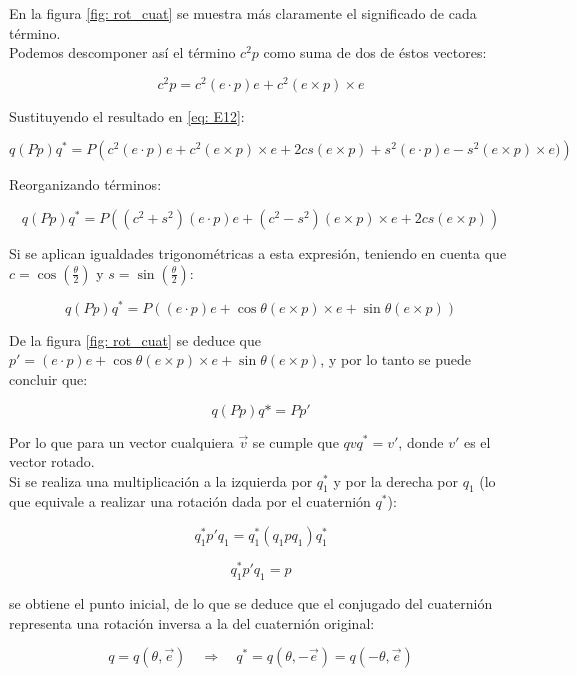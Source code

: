 \documentclass[10pt, a4paper]{report}
\begin{document}
En la figura \ref{fig: rot_cuat} se muestra más claramente el significado de cada término.\\

Podemos descomponer así el término $c^2p$ como suma de dos de éstos vectores:

$$ c^2p = c^2(e \cdot p)e + c^2(e \times p) \times e $$

Sustituyendo el resultado en \eqref{eq: E12}:

$$ q(Pp)q^* = P\left(c^2(e \cdot p)e + c^2(e \times p) \times e + 2cs(e \times p) + s^2(e \cdot p)e - s^2(e \times p) \times e)\right) $$

Reorganizando términos:

$$ q(Pp)q^* = P\left((c^2 + s^2)(e \cdot p)e + (c^2 - s^2)(e \times p) \times e + 2cs(e \times p)\right) $$

Si se aplican igualdades trigonométricas a esta expresión, teniendo en cuenta que $c = \cos\left(\frac{\theta}{2}\right)$ y $s = \sin\left(\frac{\theta}{2}\right)$:

$$ q(Pp)q^* = P\left((e \cdot p)e + \cos\theta(e \times p) \times e + \sin\theta(e \times p)\right) $$

De la figura \ref{fig: rot_cuat} se deduce que $ p' = (e \cdot p)e + \cos\theta(e \times p) \times e + \sin\theta(e \times p)$, y por lo tanto se puede concluir que:

$$ q(Pp)q* = Pp' $$

Por lo que para un vector cualquiera $\vec{v}$ se cumple que $qvq^* = v'$, donde $v'$ es el vector rotado. \\

Si se realiza una multiplicación a la izquierda por $q_1^*$ y por la derecha por $q_1$ (lo que equivale a realizar una rotación dada por el cuaternión $q^*$):

\begin{equation}
q_1^*p'q_1 = q_1^*(q_1pq_1)q_1^*
\end{equation}

\begin{equation}
q_1^*p'q_1 = p
\end{equation}

se obtiene el punto inicial, de lo que se deduce que el conjugado del cuaternión representa una rotación inversa a la del cuaternión original:

\begin{equation}
q = q\left(\theta, \vec{e} \right) \quad \Rightarrow \quad q^* = q\left(\theta, -\vec{e} \right) = q\left(-\theta, \vec{e}\right)
\end{equation}
\end{document}
